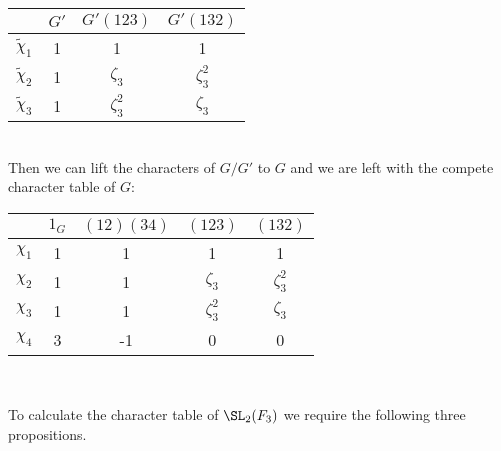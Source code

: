 \documentclass[../Project.tex]{subfiles}
\begin{document}
\begin{exam}
	\begin{minipage}{\linewidth}
\centering
	\begin{tabular}{c | c  c  c }
		  $ $ & $G'$ & $G'(123)$ & $G'(132)$\\
	\hline
		$\tilde\chi_1$ & 1 & 1 & 1\\
		$\tilde\chi_2$ & 1 & $\zeta_3$ & $\zeta_3^2$ \\
		$\tilde\chi_3$ & 1 & $\zeta_3^2$ & $\zeta_3$ \\
	\hline
	\end{tabular}
	\end{minipage}\\

Then we can lift the characters of $G/G'$ to $G$ and we are left with the compete character table of $G$:\\

\begin{minipage}{\linewidth}
	\centering
	\begin{tabular}{c | c  c  c  c }
		  $ $ & $1_{G}$ & $(12)(34)$ & $(123)$ & $(132)$\\
	\hline
		$\chi_1$ & 1 & 1 & 1 & 1 \\
		$\chi_2$ & 1 & 1 & $\zeta_3$ & $\zeta_3^2$ \\
		$\chi_3$ & 1 & 1 & $\zeta_3^2$ & $\zeta_3$ \\
		$\chi_4$ & 3 & -1 & 0 & 0 \\
	\hline
	\end{tabular}
	\end{minipage}
\label{chartableA4}\\
\end{exam}

To calculate the character table of $\SL_2(F_3)$ we require the following three propositions.
\end{document}
